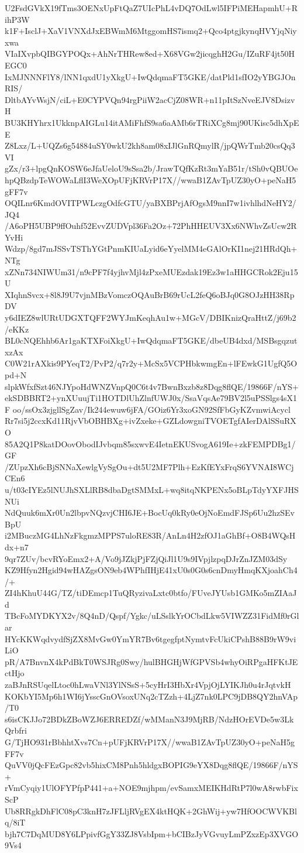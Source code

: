 U2FsdGVkX19fTms3OENxUpFtQaZ7UIcPhL4vDQ7OdLwl5IFPiMEHapmhU+RihP3W
k1F+IsclJ+XaV1VNXdJxEBWmM6MtggomHS7ismq2+Qco4ptgjkynqHVYjqNiyxwa
VIaIXvpbQIBGYPOQx+AhNrTHRew8ed+X68VGw2jicqghH2Gu/IZuRF4jt50HEGC0
IxMJNNNFlY8/lNN1qxdU1yXkgU+IwQdqmaFT5GKE/datPld1sfIO2yYBGJOnRIS/
DltbAYvWsjN/ciL+E0CYPVQn94rgPiiW2acCjZ08WR+n11pItSzNveEJV8DsizvH
BU3KHYhrx1UkknpAIGLu14itAMiFhfS9sa6aAMb6rTRiXCg8mj90UKisc5dhXpEE
Z8Lxz/L+UQZs6g54884uSY0wkU2kh8am08xIJlGnRQmylR/jpQWrTmb20csQq3VI
gZx/r3+lpgQnKOSW6eJfaUeloU9sSsa2b/JrawTQfKzRt3mYaB51r/tSh0vQBUOe
hpQBzdpTeWOWaLflI3WeXOpUFjKRVrP17X//wwaB1ZAvTpUZ30yO+peNaH5gFF7v
OQILnr6KmdOVITPWLczgOdfcGTU/yaBXBPrjAfOgsM9nnI7w1ivhlhdNeHY2/JQ4
/A6oPH5UBP9ffOuhf52EvvZUDVpl36Fa2Oz+72PhHHEUV3Xx6NWhvZsUcw2RYvHi
Wdzp/8gd7mJSSvTSThYGtPnmKIUaLyid6eYyelMM4eGAlOrKI1nej21HRdQh+NTg
xZNn734NIWUm31/n9cPF7f4yjhvMjl4zPxeMUEzdak19Ez3w1aHHGCRok2Eju15U
XIqhnSvcx+8l8J9U7vjnMBzVomczOQAuBrB69rUcL2feQ6oBJq0G8OJzHH38RpDV
y6dIEZ8wlURtUDGXTQFF2WYJmKeqhAu1w+MGcV/DBIKnizQraHttZ/j69b2/eKKz
BL0cNQEhhb6Ar1gaKTXFoiXkgU+IwQdqmaFT5GKE/dbeUB4dxd/MSBsgqzutxzAx
C0W21rAXkis9PYeqT2/PvP2/q7r2y+McSx5VCPHbkwmgEn+lFEwkG1UgfQ5Opd+N
slpkWfxfSzt46NJYpoHdWNZVnpQ0C6t4v7BwnBxzb8z8Dqg8flQE/19866F/nYS+
ekSDBBRT2+ynXUuujTi1HOTDlUhZlnfUWJ0x/SsaVqsAe79BV2l5uPSSlgs4sX1F
oo/ssOx3zjgllSgZav/Ik244ewuw6jFA/GOiz6Yr3xoGN92SfFbGyKZvmwiAcycl
Rr7si5j2ccxKd11RjvVbOBHBXg+ivZxeke+GZLdowgniTVOETgfAIerDAlSSuRXO
85A2Q1P8katDOovObodIJvbqm85sxwvE4IetnEKUSvogA619Ie+zkFEMPDBg1/GF
/ZUpzXh6cBjSNNaXewlgVySgOu+dt5U2MF7Plh+EzKfEYxFrqS6YVNAI8WCjCEn6
u/t03cIYEz5lNUJhSXLlRB8dbaDgtSMMxL+wq8itqNKPENx5oBLpTdyYXFJHSNUi
NdQuuk6mXr0Un2lbpvNQzvjCHI6JE+BocUq0kRy0eOjNoEmdFJSp6Uu2hzSEvBpU
i2MBuczMG4LhNzFkgmzMPPS7uloRE83R/AnLn4H2zfOJ1aGhBf+O8B4WQsHdx+n7
9qr7ZUv/bcvRYoEmx2+A/Vo9jJZkjPjFZjQiJl1U9s9IVpjlzpqDJrZnJZM03dSy
KZ9Hfyn2Hgid94wHAZgsON9eb4WPhfIHjE41xU0s0G0s6cnDmyHmqKXjoahCh4/+
ZI4hKhuU44G/TZ/tiDEmcp1TuQRyzivaLxtc0btfo/FUveJYUsb1GMKo5mZIAaJd
TBcFoMYDKYX2v/8Q4nD/Qspf/Ygkc/uLSslkYrOCbdLkw5VIWZZ31FidMf0rGlar
HYcKKWqdvydfSjZX8MvGw0YmYR7Bv6tgegfptNymtvFcUkiCPshB88B9rW9viLiO
pR/A7BnvnX4kPdBkT0WSJRg0Swy/hulBHGHjWfGPVSb4whyOiRPgaHFKtJEctHjo
zaBJnRSUqelLtoc0hLwaVNl3YlNSsS+5cyHrI3HbXr4VpjOjLYIKJh0u4rJqtvkH
KOKbYI5Mp6h1WI6jYsscGnOVsoxUNq2cTZzh+4LjZ7nk0LPC9jDB8QY2hnVAp/T0
s6isCKJJo72BDkZBoWZJ6ERREDZf/wMManN3J9MjRB/NdzHOrEVDe5w3LkQrbfri
G/TjHO931rBbhhtXvs7Cn+pUFjKRVrP17X//wwaB1ZAvTpUZ30yO+peNaH5gFF7v
QuVV0jQcFEzGpc82vb5hixCM8Pnh5hldgxBOPIG9eYX8Dqg8flQE/19866F/nYS+
rVmCyqiy1UlOFYPfpP441+a+NOE9mjhpm/evSamxMEIKHdRtP7l0wA8rwbFixScP
Ub8RRgkDhFlC08pC3knH7zJFLljRVgEX4ktHQK+2GhWij+yw7HfOOCWVKBlq/8iT
bjh7C7DqMUD8Y6LPpivfGgY33ZJ8VsbIpm+bCIBzJyVGvuyLmPZxzEp3XVGO9Vs4
